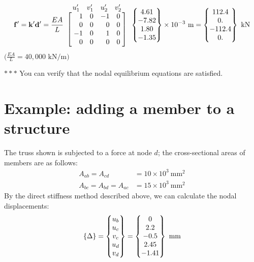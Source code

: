\begin{equation}
  \mat{f}' = \kmat'\dvec' = \frac{EA}{L}
  \begin{array}{c}
    \begin{array}{cccc} u_1' & v_1' & u_2' & v_2' \end{array}\\
    \left[\begin{array}{@{\;}r@{\quad}r@{\quad}r@{\quad}r@{\;}}
      1 & 0 & -1 & 0\\ 0 & 0 & 0 & 0\\ -1 & 0 & 1 & 0\\ 0 & 0 & 0 & 0
    \end{array}\right]
  \end{array}
  \Bmat{4.61\\ -7.82\\ 1.80\\ -1.35}\times 10^{-3}\text{ m}
  = \Bmat{112.4\\ 0.\\ -112.4\\ 0.}\text{ kN}
\end{equation}
$\bigl(\frac{EA}{L} = 40{,}000\text{ kN/m}\bigr)$
\begin{fig}
  
\end{fig}
\noindent$***$ You can verify that the nodal equilibrium equations are satisfied.

\section{Example: adding a member to a structure}
\begin{minipage}[t]{0.5\textwidth}
The truss shown is subjected to a force at node $d$; the cross-sectional areas of members are as follows:
\begin{align*}
  A_{ab} = A_{cd} &= 10\times10^3~\mathrm{mm^2}\\
  A_{bc} = A_{bd} = A_{ac} &= 15\times10^3~\mathrm{mm^2}
\end{align*}
By the direct stiffness method described above, we can calculate the nodal displacements:
\begin{equation*}
  \{\Delta\} = \begin{Bmatrix}u_b\\ u_c\\ v_c\\ u_d\\ v_d\end{Bmatrix} = \begin{Bmatrix}0\\ 2.2\\ -0.5\\ 2.45\\ -1.41\end{Bmatrix}\text{ mm}
\end{equation*}
\end{minipage}\hfill
\begin{minipage}[t]{0.45\textwidth}
\vspace{0pt}\centering

\end{minipage}

